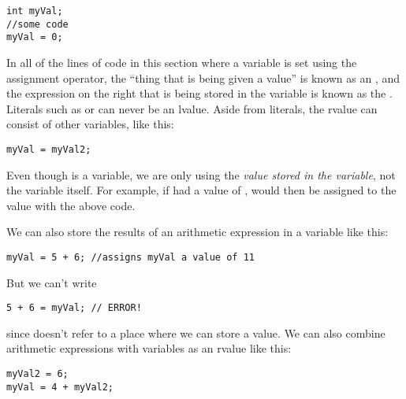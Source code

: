 \noindent\begin{minipage}{\linewidth}\begin{lstlisting}
int myVal;
//some code
myVal = 0; 
\end{lstlisting}\end{minipage}

In all of the lines of code in this section where a variable is set using the assignment operator, the ``thing that is being given a value'' is known as an , and the expression on the right that is being stored in the variable is known as the . 
Literals such as  or  can never be an lvalue. 
Aside from literals, the rvalue can consist of other variables, like this:

\noindent\begin{minipage}{\linewidth}\begin{lstlisting}
myVal = myVal2;
\end{lstlisting}\end{minipage}

Even though  is a variable, we are only using the \textit{value stored in the variable}, not the variable itself. 
For example, if  had a value of ,  would then be assigned to the value  with the above code. 

We can also store the results of an arithmetic expression in a variable like this: 

\noindent\begin{minipage}{\linewidth}\begin{lstlisting}
myVal = 5 + 6; //assigns myVal a value of 11
\end{lstlisting}\end{minipage}

But we can't write

\noindent\begin{minipage}{\linewidth}\begin{lstlisting}
5 + 6 = myVal; // ERROR!
\end{lstlisting}\end{minipage}

\noindent since  doesn't refer to a place where we can store a value. 
We can also combine arithmetic expressions with variables as an rvalue like this:

\noindent\begin{minipage}{\linewidth}\begin{lstlisting}
myVal2 = 6;
myVal = 4 + myVal2;
\end{lstlisting}\end{minipage}

